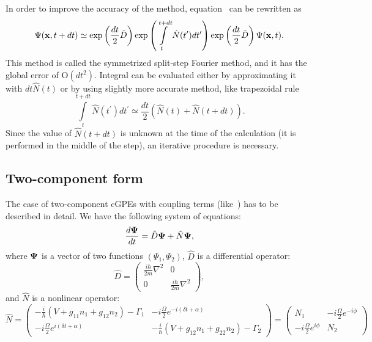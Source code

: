 In order to improve the accuracy of the method, equation~ can be rewritten as~\cite{Sinkin2003}
\[
    \Psi(\mathbf{x}, t + dt) \simeq
    \exp \left( \frac{dt}{2} \hat{D} \right)
    \exp \left( \int\limits^{t + dt}_t \hat{N} (t^\prime) dt^\prime \right)
    \exp \left( \frac{dt}{2} \hat{D} \right) \Psi(\mathbf{x}, t).
\]
This method is called the symmetrized split-step Fourier method, and it has the global error of $\mbox{O}(dt^2)$.
Integral can be evaluated either by approximating it with $dt \hat{N}(t)$ or by using slightly more accurate method,
like trapezoidal rule
\[
    \int\limits^{t + dt}_t \hat{N} (t^\prime) dt^\prime \simeq
    \frac{dt}{2} \left( \hat{N}(t) + \hat{N}(t + dt) \right).
\]
Since the value of $\hat{N}(t + dt)$ is unknown at the time of the calculation
(it is performed in the middle of the step), an iterative procedure is necessary.


\subsection{Two-component form}

The case of two-component cGPEs with coupling terms (like~)
has to be described in detail.
We have the following system of equations:
\begin{equation}
\label{eqn:split-step:two-comp-eqn}
    \frac{d \mathbf{\Psi}}{dt} = \hat{D} \mathbf{\Psi} + \hat{N} \mathbf{\Psi},
\end{equation}
where $\mathbf{\Psi}$ is a vector of two functions $(\Psi_1, \Psi_2)$,
$\hat{D}$ is a differential operator:
\[
    \hat{D} = \begin{pmatrix}
        \frac{i \hbar}{2 m} \nabla^2 & 0 \\
        0 & \frac{i \hbar}{2 m} \nabla^2
    \end{pmatrix},
\]
and $\hat{N}$ is a nonlinear operator:
\[
    \hat{N} = \begin{pmatrix}
        -\frac{i}{\hbar} \left( V + g_{11} n_1 + g_{12} n_2 \right) - \Gamma_1 &
        -i \frac{\Omega}{2} e^{-i (\delta t + \alpha)} \\
        -i \frac{\Omega}{2} e^{i (\delta t + \alpha)} &
        -\frac{i}{\hbar} \left( V + g_{12} n_1 + g_{22} n_2 \right) - \Gamma_2
    \end{pmatrix}
    = \begin{pmatrix}
        N_1 & -i \frac{\Omega}{2} e^{-i \phi} \\ - i \frac{\Omega}{2} e^{i \phi} & N_2
    \end{pmatrix}
\]

